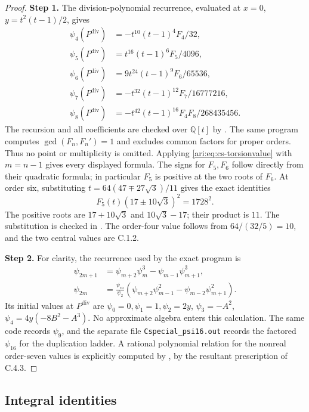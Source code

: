 \begin{proof}
\noindent\textbf{Step 1.} The division-polynomial recurrence, evaluated at $x=0$,
$y=t^2(t-1)/2$, gives
\[
 \begin{aligned}
 \psi_4(P^{\mathrm{div}})&=-t^{10}(t-1)^4F_4/32,\\
 \psi_5(P^{\mathrm{div}})&=t^{16}(t-1)^6F_5/4096,\\
 \psi_6(P^{\mathrm{div}})&=9t^{24}(t-1)^9F_6/65536,\\
 \psi_7(P^{\mathrm{div}})&=-t^{32}(t-1)^{12}F_7/16777216,\\
 \psi_8(P^{\mathrm{div}})&=-t^{42}(t-1)^{16}F_4F_8/268435456.
 \end{aligned}
\]
The recursion and all coefficients are checked over $\mathbb Q[t]$
by . The same program computes
$\gcd(F_n,F_n')=1$ and excludes common factors for proper orders.
Thus no point or multiplicity is omitted. Applying
\eqref{ari:eq:cs-torsionvalue} with $m=n-1$ gives every displayed
formula. The signs for $F_5,F_6$ follow directly from their quadratic
formula; in particular $F_5$ is positive at the two roots of $F_6$.
At order six, substituting
$t=64(47\mp27\sqrt3)/11$ gives the exact identities
\[
 F_5(t)(17\pm10\sqrt3)^2=1728^2.
\]
The positive roots are $17+10\sqrt3$ and $10\sqrt3-17$; their
product is $11$. The substitution is checked in
. The order-four value follows from
$64/(32/5)=10$, and the two central values are C.1.2.


\noindent\textbf{Step 2.} For clarity, the recurrence used by the exact program is
\[
 \begin{aligned}
 \psi_{2m+1}&=\psi_{m+2}\psi_m^3-\psi_{m-1}\psi_{m+1}^3,\\
 \psi_{2m}&=\frac{\psi_m}{\psi_2}
   (\psi_{m+2}\psi_{m-1}^2-\psi_{m-2}\psi_{m+1}^2).
 \end{aligned}
\]
Its initial values at $P^{\mathrm{div}}$ are $\psi_0=0,\psi_1=1,\psi_2=2y$,
$\psi_3=-A^2$, $\psi_4=4y(-8B^2-A^3)$. No approximate algebra
enters this calculation. The same code records $\psi_9$, and the
separate file \texttt{Cspecial\_psi16.out} records the factored
$\psi_{16}$ for the duplication ladder. A rational polynomial
relation for the nonreal order-seven values is explicitly computed
by , by the resultant prescription
of C.4.3.
\end{proof}

\subsection{Integral identities}

